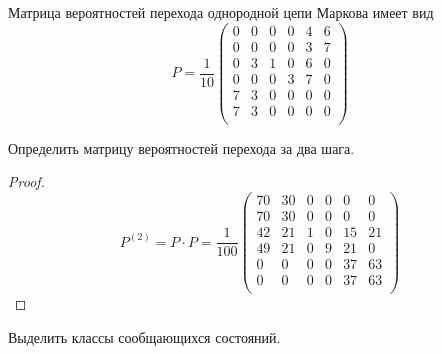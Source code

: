 
\renewcommand*{\proofname}{Решение}
Матрица вероятностей перехода однородной цепи Маркова имеет вид
\[
P = \frac{1}{10}\begin{pmatrix}
    0 & 0 & 0 & 0 & 4 & 6 \\
    0 & 0 & 0 & 0 & 3 & 7 \\
    0 & 3 & 1 & 0 & 6 & 0 \\
    0 & 0 & 0 & 3 & 7 & 0 \\
    7 & 3 & 0 & 0 & 0 & 0 \\
    7 & 3 & 0 & 0 & 0 & 0 \\
\end{pmatrix}
\]

\begin{problem}
Определить матрицу вероятностей перехода за два шага.
\end{problem}

\begin{proof}
\[
P^{(2)} = P\cdot P = \frac{1}{100}\begin{pmatrix}
    70 & 30 & 0 & 0 & 0 & 0 \\
    70 & 30 & 0 & 0 & 0 & 0 \\
    42 & 21 & 1 & 0 & 15 & 21 \\
    49 & 21 & 0 & 9 & 21 & 0 \\
    0 & 0 & 0 & 0 & 37 & 63 \\
    0 & 0 & 0 & 0 & 37 & 63 \\
\end{pmatrix}
\]
\end{proof}

\begin{problem}
Выделить классы сообщающихся состояний.
\end{problem}

